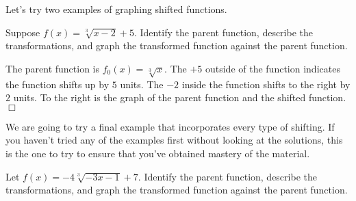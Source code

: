 \documentclass[../book.tex]{subfiles}
\begin{document}
Let's try two examples of graphing shifted functions.
\begin{example}
Suppose $f(x)=\sqrt[3]{x-2}+5$.  Identify the parent function, describe the transformations, and graph the transformed function against the parent function.
\end{example}
\begin{solution}
The parent function is $f_0(x)=\sqrt[3]{x}$.  The $+5$ outside of the function indicates the function shifts up by $5$ units.  The $-2$ inside the function shifts to the right by $2$ units.  To the right is the graph of the parent function and the shifted function.  $\Box$
\end{solution}
We are going to try a final example that incorporates every type of shifting.  If you haven't tried any of the examples first without looking at the solutions, this is the one to try to ensure that you've obtained mastery of the material.
\begin{example}
Let $f(x)=-4\sqrt[3]{-3x-1}+7$.  Identify the parent function, describe the transformations, and graph the transformed function against the parent function.
\end{example}
\end{document}
